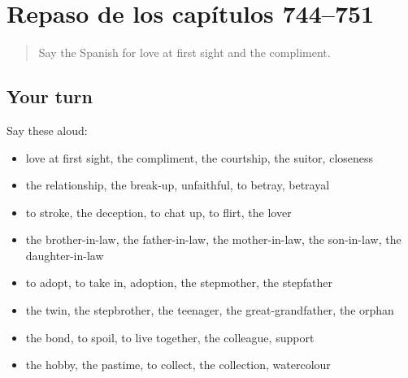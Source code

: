 \section[(dialogue)]{Repaso de los capítulos 744–751}

\label{lesson:ES-R751-repaso-744-751}



\begin{quote}
Say the Spanish for love at first sight and the compliment.
\end{quote}

\subsection*{Your turn}
Say these aloud:

\begin{itemize}
\raggedright
  \item love at first sight, the compliment, the courtship, the suitor, closeness
  \item the relationship, the break-up, unfaithful, to betray, betrayal
  \item to stroke, the deception, to chat up, to flirt, the lover
  \item the brother-in-law, the father-in-law, the mother-in-law, the son-in-law, the daughter-in-law
  \item to adopt, to take in, adoption, the stepmother, the stepfather
  \item the twin, the stepbrother, the teenager, the great-grandfather, the orphan
  \item the bond, to spoil, to live together, the colleague, support
  \item the hobby, the pastime, to collect, the collection, watercolour
\end{itemize}


